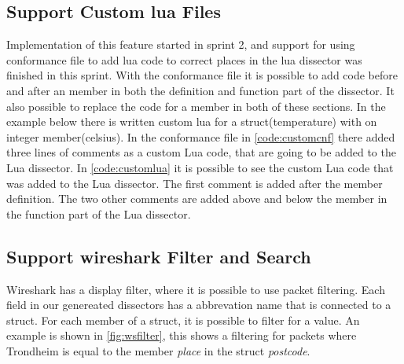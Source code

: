 \subsection{Support Custom \Gls{lua} Files}
Implementation of this feature started in sprint 2, and support for using 
conformance file to add lua code to correct places in the lua dissector was 
finished in this sprint. With the conformance file it is possible to add code 
before and after an member in both the definition and function part of the 
dissector. It also possible to replace the code for a member in both of these 
sections. In the example below there is written custom lua for a 
struct(temperature) with on integer member(celsius). In the conformance file 
in \autoref{code:customcnf} there added three lines of comments as a custom 
Lua code, that are going to be added to the Lua dissector. In 
\autoref{code:customlua} it is possible to see the custom Lua code that was 
added to the Lua dissector. The first comment is added after the member 
definition. The two other comments are added above and below the member in the 
function part of the Lua dissector.





\subsection{Support \Gls{wireshark} Filter and Search}
Wireshark has a display filter, where it is possible to use packet filtering. 
Each field in our genereated dissectors has a abbrevation name that is 
connected to a struct. For each member of a struct, it is possible to filter 
for a value. An example is shown in \autoref{fig:wsfilter}, this shows a 
filtering for packets where Trondheim is equal to the member \emph{place} in 
the struct \emph{postcode}. 

